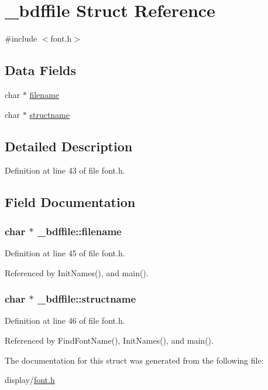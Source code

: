 \hypertarget{struct__bdffile}{}\section{\+\_\+bdffile Struct Reference}
\label{struct__bdffile}


{\ttfamily \#include $<$font.\+h$>$}

\subsection*{Data Fields}
\begin{DoxyCompactItemize}
\item 
char $\ast$ \hyperlink{struct__bdffile_a040674bb1df0a8d4b1bedeae616e9b65}{filename}
\item 
char $\ast$ \hyperlink{struct__bdffile_a54e6c69f33cc656848ad924faba85b53}{structname}
\end{DoxyCompactItemize}


\subsection{Detailed Description}


Definition at line 43 of file font.\+h.



\subsection{Field Documentation}
\subsubsection[{\texorpdfstring{filename}{filename}}]{\setlength{\rightskip}{0pt plus 5cm}char $\ast$ \+\_\+bdffile\+::filename}\hypertarget{struct__bdffile_a040674bb1df0a8d4b1bedeae616e9b65}{}\label{struct__bdffile_a040674bb1df0a8d4b1bedeae616e9b65}


Definition at line 45 of file font.\+h.



Referenced by Init\+Names(), and main().

\subsubsection[{\texorpdfstring{structname}{structname}}]{\setlength{\rightskip}{0pt plus 5cm}char $\ast$ \+\_\+bdffile\+::structname}\hypertarget{struct__bdffile_a54e6c69f33cc656848ad924faba85b53}{}\label{struct__bdffile_a54e6c69f33cc656848ad924faba85b53}


Definition at line 46 of file font.\+h.



Referenced by Find\+Font\+Name(), Init\+Names(), and main().



The documentation for this struct was generated from the following file\+:\begin{DoxyCompactItemize}
\item 
display/\hyperlink{display_2font_8h}{font.\+h}\end{DoxyCompactItemize}
